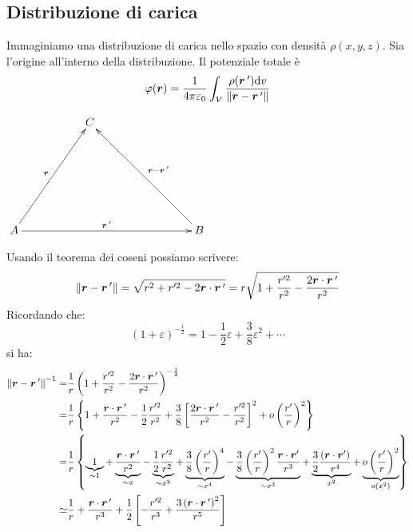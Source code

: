 \subsection{Distribuzione di carica}
Immaginiamo una distribuzione di carica nello spazio con densità $\rho(x,y,z)$. Sia l'origine all'interno della distribuzione. Il potenziale totale è
\begin{equation}
  \varphi(\boldsymbol{r})=\frac{1}{4\pi\varepsilon_0}\int_V\frac{\rho(\boldsymbol{r}\,')\mathrm{d} v}{\left\lVert\boldsymbol{r}-\boldsymbol{r}\,'\right\rVert}
  \label{multipolo_01}
\end{equation}
\begin{center}
  $
    \xymatrix{
      &&C&&&\\
      \\
      \\
      A\ar[rruuu]^{\ve r}\ar[rrrrr]^{\ve r\,'}&&&&&B\ar[llluuu]_{\ve r-\ve r\,'}
    }$\end{center}
Usando il teorema dei coseni possiamo scrivere:
\[\left\lVert\boldsymbol{r}-\boldsymbol{r}\,'\right\rVert=\sqrt{r^2+r'^2-2\boldsymbol{r}\cdot \boldsymbol{r}\,'}=r\sqrt{1+\frac{r'^2}{r^2}-\frac{2\boldsymbol{r}\cdot \boldsymbol{r}\,'}{r^2}}\]
Ricordando che:
\[(1+\varepsilon)^{-\frac{1}{2}}=1-\frac{1}{2}\varepsilon+\frac{3}{8}\varepsilon^2+\cdots\]
si ha:
\begin{align*}
  {\left\lVert\boldsymbol{r}-\boldsymbol{r}\,'\right\rVert}^{-1}= & \frac{1}{r}\left(1+\frac{r'^2}{r^2}-\frac{2\boldsymbol{r}\cdot \boldsymbol{r}\,'}{r^2}\right)^{-\frac{1}{2}}                                                                                                                                                                                                                                                                                                                                             \\
  =                             & \frac{1}{r}\left\{1+\frac{\boldsymbol{r}\cdot\boldsymbol{r}\,'}{r^2}-\frac{1}{2}\frac{r'^2}{r^2}+\frac{3}{8}\left[\frac{2\boldsymbol{r}\cdot\boldsymbol{r}\,'}{r^2}-\frac{r'^2}{r^2}\right]^2+o\left(\frac{r'}{r}\right)^2\right\}                                                                                                                                                                                                                                         \\
  =                             & \frac{1}{r}\left\{\underbrace{1}_{\sim 1}+\underbrace{\frac{\boldsymbol{r}\cdot\boldsymbol{r}\,'}{r^2}}_{\sim x}-\underbrace{\frac{1}{2}\frac{r'^2}{r^2}}_{\sim x^2}+\underbrace{\frac{3}{8}\left(\frac{r'}{r}\right)^4}_{\sim x^4}-\underbrace{\frac{3}{8}\left(\frac{r'}{r}\right)^2\frac{\boldsymbol{r}\cdot \boldsymbol{r}'}{r^3}}_{\sim x^3}+\underbrace{\frac{3}{2}\frac{(\boldsymbol{r}\cdot \boldsymbol{r}')}{r^4}}_{x^2}+\underbrace{o\left(\frac{r'}{r}\right)^2}_{o(x^2)}\right\} \\
  \simeq                        & \frac{1}{r}+\frac{\boldsymbol{r}\cdot\boldsymbol{r}\,'}{r^3}+\frac{1}{2}\left[-\frac{r'^2}{r^3}+\frac{3\left(\boldsymbol{r}\cdot\boldsymbol{r}\,'\right)^2}{r^5}\right]                                                                                                                                                                                                                                                                                                    \\
\end{align*}
